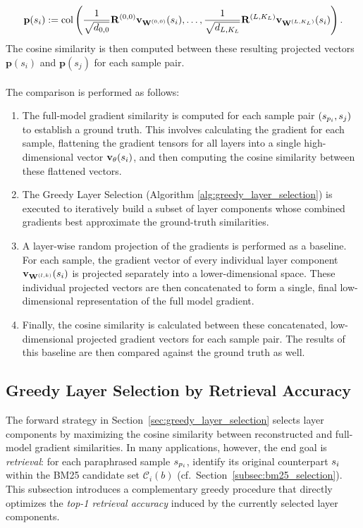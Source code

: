 \begin{equation}
    \mathbf{p}(s_i) := \operatorname{col}\left( \frac{1}{\sqrt{d_{0,0}}} \mathbf{R}^{(0,0)} \vXsi[\W^{(0,0)}], \dots, \frac{1}{\sqrt{d_{L,K_L}}} \mathbf{R}^{(L,K_L)} \vXsi[\W^{(L,K_L)}] \right).
\end{equation}
The cosine similarity is then computed between these resulting projected vectors $\mathbf{p}(s_i)$ and $\mathbf{p}(s_j)$ for each sample pair.
\\\\
The comparison is performed as follows:
\begin{enumerate}
    \item The {full-model gradient similarity} is computed for each sample pair $(\spi, \sj)$ to establish a ground truth. This involves calculating the gradient for each sample, flattening the gradient tensors for all layers into a single high-dimensional vector $\vXsi[\theta]$, and then computing the cosine similarity between these flattened vectors.
    \item The Greedy Layer Selection (Algorithm \ref{alg:greedy_layer_selection}) is executed to iteratively build a subset of layer components whose combined gradients best approximate the ground-truth similarities.
    \item A layer-wise random projection of the gradients is performed as a baseline. For each sample, the gradient vector of every individual layer component $\vXsi[\Wlk]$ is projected separately into a lower-dimensional space. These individual projected vectors are then concatenated to form a single, final low-dimensional representation of the full model gradient.
    \item Finally, the cosine similarity is calculated between these concatenated, low-dimensional projected gradient vectors for each sample pair. The results of this baseline are then compared against the ground truth as well. 
\end{enumerate}


\subsection{Greedy Layer Selection by Retrieval Accuracy}\label{subsec:gls_accuracy}
The forward strategy in Section~\ref{sec:greedy_layer_selection} selects layer components by maximizing the cosine similarity between reconstructed and full-model gradient similarities. In many applications, however, the end goal is \emph{retrieval}: for each paraphrased sample $\spi$, identify its original counterpart $\si$ within the BM25 candidate set $\mathcal{C}_i(b)$ (cf.\ Section~\ref{subsec:bm25_selection}). This subsection introduces a complementary greedy procedure that directly optimizes the \emph{top-1 retrieval accuracy} induced by the currently selected layer components.

